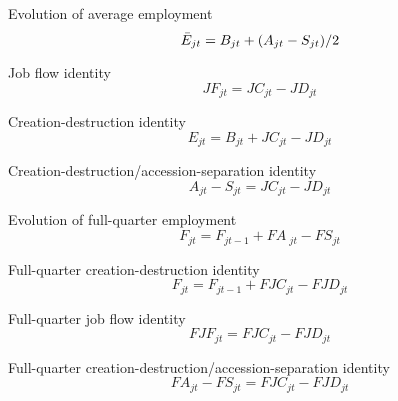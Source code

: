 \begin{definition}
Evolution of average employment 
\begin{equation*}
\bar{E}_{jt} = B_{jt} + {\left( {A_{jt} - S_{jt} } \right)} \mathord{\left/
{\vphantom {{\left( {A_{jt} - S_{jt} } \right)} 2}} \right.
\kern-\nulldelimiterspace} 2
\end{equation*}
\end{definition}

\begin{definition}
Job flow identity 
\begin{equation*}
JF_{jt} = JC_{jt} - JD_{jt}
\end{equation*}
\end{definition}

\begin{definition}
Creation-destruction identity 
\begin{equation*}
E_{jt} = B_{jt} + JC_{jt} - JD_{jt}
\end{equation*}
\end{definition}

\begin{definition}
Creation-destruction/accession-separation identity 
\begin{equation*}
A_{jt} - S_{jt} = JC_{jt} - JD_{jt}
\end{equation*}
\end{definition}

\begin{definition}
Evolution of full-quarter employment 
\begin{equation*}
F_{jt} = F_{jt - 1} + FA{\ }_{jt} - FS_{jt}
\end{equation*}
\end{definition}

\begin{definition}
Full-quarter creation-destruction identity 
\begin{equation*}
F_{jt} = F_{jt - 1} + FJC_{jt} - FJD_{jt}
\end{equation*}
\end{definition}

\begin{definition}
Full-quarter job flow identity 
\begin{equation*}
FJF_{jt} = FJC_{jt} - FJD_{jt}
\end{equation*}
\end{definition}

\begin{definition}
Full-quarter creation-destruction/accession-separation identity 
\begin{equation*}
FA_{jt} - FS_{jt} = FJC_{jt} - FJD_{jt}
\end{equation*}
\end{definition}


